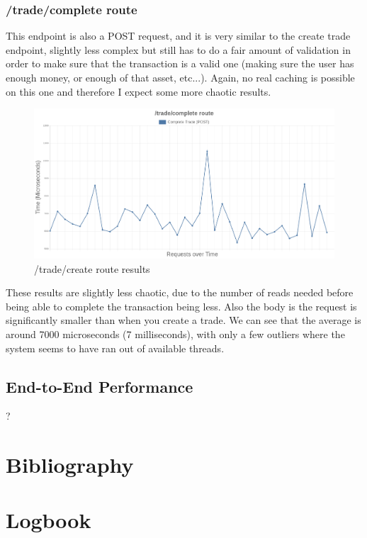 \documentclass[titlepage]{article}
\begin{document}
\pagebreak
\subsubsection{/trade/complete route}
This endpoint is also a POST request, and it is very similar to the create trade endpoint, slightly less complex but still has to do a fair amount of validation in order to make sure that the transaction is a valid one (making sure the user has enough money, or enough of that asset, etc...). Again, no real caching is possible on this one and therefore I expect some more chaotic results.

\begin{figure}[h!]
  \caption{/trade/create route results}
\hspace*{-3cm}
\includegraphics[width=1.5\textwidth]{../results/complete-trade.png}
\end{figure}

These results are slightly less chaotic, due to the number of reads needed before being able to complete the transaction being less. Also the body is the request is significantly smaller than when you create a trade. We can see that the average is around 7000 microseconds (7 milliseconds), with only a few outliers where the system seems to have ran out of available threads. 

\subsection{End-to-End Performance}
?

\section{Bibliography}




\section{Logbook}
\end{document}
